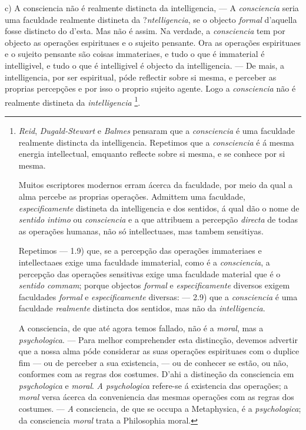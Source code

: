 c) A consciencia não é realmente distincta da intelligencia, --- A \emph{consciencia} seria uma faculdade realmente distineta da ?\emph{ntelligencia}, se o objecto \emph{formal} d'aquella fosse distincto do d'esta. Mas não é assim. Na verdade, a \emph{consciencia} tem por objecto as operações espirituaes e o sujeito pensante. Ora as operações espirituaes e o sujeito pensante são coisas immateriaes, e tudo o que é immaterial é intelligivel, e tudo o que é intelligivel é objecto da intelligencia. --- De mais, a intelligencia, por ser espiritual, póde reflectir sobre si mesma, e perceber as proprias   percepções e por isso o proprio sujeito agente. Logo a \emph{consciencia} não é realmente distineta da \emph{intelligencia} \footnote{\emph{Reid}, \emph{Dugald-Stewart} e \emph{Balmes} pensaram que a \emph{consciencia} é uma faculdade realmente distincta da intelligencia. Repetimos que a \emph{consciencia} é á mesma energia intellectual, emquanto reflecte sobre si mesma, e se conhece por si mesma.\par Muitos escriptores modernos erram ácerca da faculdade, por meio da qual a alma percebe as proprias operações. Admittem uma faculdade, \emph{especificamente} distineta da intelligencia e dos sentidos, á qual dão o nome de \emph{sentido intimo} ou \emph{consciencia} e a que attribuem a percepção \emph{directa} de todas as operações humanas, não só intellectuaes, mas tambem sensitiyas.\par Repetimos --- 1.9) que, se a percepção das operações immateriaes e intellectaaes exige uma faculdade immaterial, como é a \emph{consciencia}, a percepção das operações sensitivas exige uma faculdade material que é o \emph{sentido commam}; porque objectos \emph{formal} e \emph{especificamente} diversos exigem faculdades \emph{formal} e \emph{especificamente} diversas: --- 2.9) que a \emph{consciencia} é uma faculdade \emph{realmente} distincta dos sentidos, mas não da \emph{intelligencia}.\par A consciencia, de que até agora temos fallado, não é a \emph{moral}, mas a \emph{psychologica}. --- Para melhor comprehender esta distincção, devemos advertir que a nossa alma póde considerar as suas operações espirituaes com o duplice fim --- ou de perceber a sua existencia, --- ou de conhecer se estão, ou não, conformes com as regras dos costumes. D'ahi a distineção da consciencia em \emph{psychologica} e \emph{moral}. \emph{A psychologica} refere-se á existencia das operações; a \emph{moral} versa ácerca da conveniencia das mesmas operações com as regras dos costumes. --- \emph{A} consciencia, de que se occupa a Metaphysica, é a \emph{psychologica}; da consciencia \emph{moral} trata a Philosophia moral.}.

